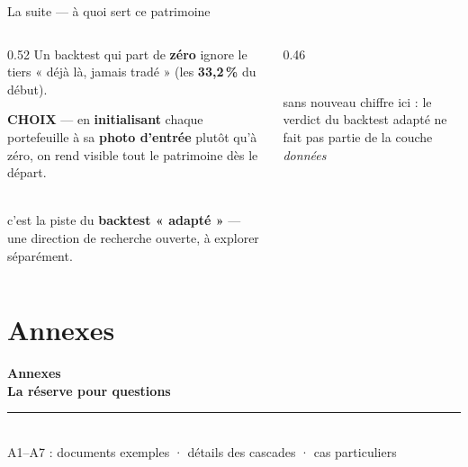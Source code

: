 \documentclass[11pt,aspectratio=169]{beamer}
\newcommand{\choixbox}[1]{%
  \colorbox{alertred!8}{\parbox{\dimexpr\linewidth-8pt}{\scriptsize
    \textbf{\textcolor{alertred}{CHOIX}}\; --- #1}}}
\begin{document}
\begin{frame}{La suite --- à quoi sert ce patrimoine}
  \begin{columns}[c]
    \begin{column}{0.52\textwidth}
      {\footnotesize Un backtest qui part de \textbf{zéro} ignore le tiers « déjà là, jamais
       tradé » (les \textbf{33,2\,\%} du début).}\\[2.5mm]
      \choixbox{en \textbf{initialisant} chaque portefeuille à sa \textbf{photo d'entrée}
       plutôt qu'à zéro, on rend visible tout le patrimoine dès le départ.}\\[2.5mm]
      {\footnotesize c'est la piste du \textbf{backtest « adapté »} --- une direction de
       recherche ouverte, à explorer séparément.}
    \end{column}
    \begin{column}{0.46\textwidth}\centering
      \\[2mm]
      {\scriptsize\color{black!55} sans nouveau chiffre ici : le verdict du backtest adapté
       ne fait pas partie de la couche \emph{données}}
    \end{column}
  \end{columns}
\end{frame}

\section{Annexes}

\begin{frame}[plain]
  \centering\vfill
  {\color{helec!85}\large\textbf{Annexes}}\\[2mm]
  {\color{black!88}\fontsize{29}{33}\selectfont\textbf{La réserve pour questions}}\\[4mm]
  {\color{helec!45}\rule{0.30\textwidth}{1.2pt}}\\[4mm]
  {\color{black!55}\large A1--A7 : documents exemples · détails des cascades · cas particuliers}
  \vfill
\end{frame}
\end{document}
